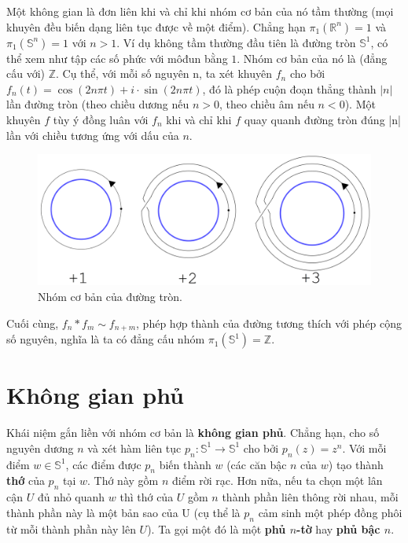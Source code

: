 \documentclass[12pt]{article}
\begin{document}
Một không gian là đơn liên khi và chỉ khi nhóm cơ bản của nó tầm thường (mọi khuyên đều biến dạng liên tục được về một điểm). Chẳng hạn $\pi_1(\mathbb{R}^n) = 1$ và $\pi_1(\mathbb{S}^n) = 1$ với $n > 1$. Ví dụ không tầm thường đầu tiên là đường tròn $\mathbb{S}^1$, có thể xem như tập các số phức với môđun bằng $1$. Nhóm cơ bản của nó là (đẳng cấu với) $\mathbb{Z}$. Cụ thể, với mỗi số nguyên n, ta xét khuyên $f_n$ cho bởi $f_n(t) = \cos(2n \pi t)+i\cdot \sin(2n\pi t)$, đó là phép cuộn đoạn thẳng thành $|n|$ lần đường tròn (theo chiều dương nếu $n > 0$, theo chiều âm nếu $n < 0$). Một khuyên $f$ tùy ý đồng luân với $f_n$ khi và chỉ khi $f$ quay quanh đường tròn đúng |n| lần với chiều tương ứng với dấu của $n$.

\begin{figure}[h!]
    \centering
    \includegraphics[scale = .1]{h6.png}
    \caption{Nhóm cơ bản của đường tròn.}
    \label{h6}
\end{figure}

Cuối cùng, $f_n \ast f_m \sim f_{n+m}$, phép hợp thành của đường tương thích với phép cộng số nguyên, nghĩa là ta có đẳng cấu nhóm $\pi_1(\mathbb{S}^1) = \mathbb{Z}$.



\section{Không gian phủ}

Khái niệm gắn liền với nhóm cơ bản là {\bf không gian phủ}. Chẳng hạn, cho số nguyên dương $n$ và xét hàm liên tục $p_n: \mathbb{S}^1 \to \mathbb{S}^1$ cho bởi $p_n(z) = z^n$. Với mỗi điểm $w \in \mathbb{S}^1$, các điểm được $p_n$ biến thành $w$ (các căn bậc $n$ của $w$) tạo thành {\bf thớ} của $p_n$ tại $w$. Thớ này gồm $n$ điểm rời rạc. Hơn nữa, nếu ta chọn một lân cận $U$ đủ nhỏ quanh $w$ thì thớ của $U$ gồm $n$ thành phần liên thông rời nhau, mỗi thành phần này là một bản sao của U (cụ thể là $p_n$ cảm sinh một phép đồng phôi từ mỗi thành phần này lên $U$). Ta gọi một đó là một {\bf phủ $n$-tờ} hay {\bf phủ bậc $n$}. 
\end{document}
